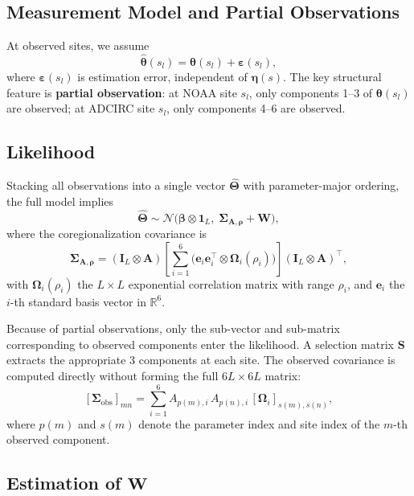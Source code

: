 \documentclass[11pt]{article}
\newcommand{\bbR}{\mathbb{R}}
\newcommand{\btheta}{\bm{\theta}}
\newcommand{\bbeta}{\bm{\beta}}
\newcommand{\bfeta}{\bm{\eta}}
\newcommand{\beps}{\bm{\varepsilon}}
\newcommand{\bA}{\mathbf{A}}
\newcommand{\bW}{\mathbf{W}}
\newcommand{\bI}{\mathbf{I}}
\newcommand{\bS}{\mathbf{S}}
\newcommand{\bSigma}{\bm{\Sigma}}
\newcommand{\bOmega}{\bm{\Omega}}
\newcommand{\bTheta}{\bm{\Theta}}
\newcommand{\be}{\mathbf{e}}
\begin{document}
\subsection{Measurement Model and Partial Observations}

At observed sites, we assume
\[
\hat{\btheta}(s_l) = \btheta(s_l) + \beps(s_l),
\]
where $\beps(s_l)$ is estimation error, independent of $\bfeta(s)$. The key structural feature is \textbf{partial observation}: at NOAA site $s_l$, only components 1--3 of $\btheta(s_l)$ are observed; at ADCIRC site $s_l$, only components 4--6 are observed.

\subsection{Likelihood}

Stacking all observations into a single vector $\hat{\bTheta}$ with parameter-major ordering, the full model implies
\begin{equation}\label{eq:likelihood}
\hat{\bTheta} \sim \mathcal{N}\!\bigl(\bbeta \otimes \mathbf{1}_L,\; \bSigma_{\bA,\bm{\rho}} + \bW\bigr),
\end{equation}
where the coregionalization covariance is
\[
\bSigma_{\bA,\bm{\rho}} = (\bI_L \otimes \bA) \left[\sum_{i=1}^{6} \bigl(\be_i \be_i^\top \otimes \bOmega_i(\rho_i)\bigr)\right] (\bI_L \otimes \bA)^\top,
\]
with $\bOmega_i(\rho_i)$ the $L \times L$ exponential correlation matrix with range $\rho_i$, and $\be_i$ the $i$-th standard basis vector in $\bbR^6$.

Because of partial observations, only the sub-vector and sub-matrix corresponding to observed components enter the likelihood. A selection matrix $\bS$ extracts the appropriate 3 components at each site. The observed covariance is computed directly without forming the full $6L \times 6L$ matrix:
\[
[\bSigma_{\text{obs}}]_{mn} = \sum_{i=1}^{6} A_{p(m),i}\, A_{p(n),i}\, [\bOmega_i]_{s(m),s(n)},
\]
where $p(m)$ and $s(m)$ denote the parameter index and site index of the $m$-th observed component.

\subsection{Estimation of $\bW$}
\end{document}
